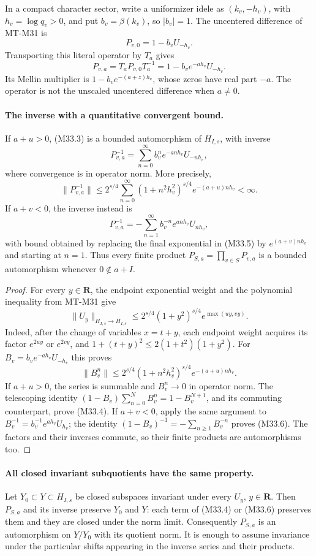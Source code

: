 In a compact character sector, write a uniformizer idele
as $(k_v,-h_v)$, with $h_v=\log q_v>0$, and put
$b_v=\beta(k_v)$, so $|b_v|=1$.
The uncentered difference of MT-M31 is
\[
 P_{v,0}=1-b_vU_{-h_v}.
\]
Transporting this literal operator by $T_a$ gives
\[
 P_{v,a}=T_aP_{v,0}T_a^{-1}
                 =1-b_ve^{-ah_v}U_{-h_v}.
 \tag{M33.3}
\]
Its Mellin multiplier is
$1-b_ve^{-(a+z)h_v}$, whose zeros have real part $-a$.
The operator is not the unscaled uncentered difference
when $a\ne0$.

\paragraph{The inverse with a quantitative convergent bound.}
If $a+u>0$, (M33.3) is a bounded automorphism of
$H_{I,s}$, with inverse
\[
 P_{v,a}^{-1}
       =\sum_{n=0}^{\infty}b_v^ne^{-anh_v}U_{-nh_v},
 \tag{M33.4}
\]
where convergence is in operator norm.  More precisely,
\[
 \|P_{v,a}^{-1}\|
 \leq 2^{s/4}\sum_{n=0}^{\infty}
       (1+n^2h_v^2)^{s/4}e^{-(a+u)nh_v}<\infty.
 \tag{M33.5}
\]
If $a+v<0$, the inverse instead is
\[
 P_{v,a}^{-1}
      =-\sum_{n=1}^{\infty}b_v^{-n}e^{anh_v}U_{nh_v},
 \tag{M33.6}
\]
with bound obtained by replacing the final exponential
in (M33.5) by $e^{(a+v)nh_v}$ and starting at $n=1$.
Thus every finite product
$P_{S,a}=\prod_{v\in S}P_{v,a}$ is a bounded
automorphism whenever $0\notin a+I$.

\begin{proof}
For every $y\in\mathbf R$, the endpoint exponential
weight and the polynomial inequality from MT-M31 give
\[
 \|U_y\|_{H_{I,s}\to H_{I,s}}
 \leq2^{s/4}(1+y^2)^{s/4}
                      e^{\max(uy,vy)}.
 \tag{M33.7}
\]
Indeed, after the change of variables $x=t+y$, each
endpoint weight acquires its factor $e^{2uy}$ or
$e^{2vy}$, and
$1+(t+y)^2\leq2(1+t^2)(1+y^2)$.
For $B_v=b_ve^{-ah_v}U_{-h_v}$ this proves
\[
 \|B_v^n\|\leq2^{s/4}(1+n^2h_v^2)^{s/4}
                                      e^{-(a+u)nh_v}.
\]
If $a+u>0$, the series is summable and $B_v^n\to0$
in operator norm.  The telescoping identity
$(1-B_v)\sum_{n=0}^{N}B_v^n=1-B_v^{N+1}$,
and its commuting counterpart, prove (M33.4).
If $a+v<0$, apply the same argument to
$B_v^{-1}=b_v^{-1}e^{ah_v}U_{h_v}$; the identity
$(1-B_v)^{-1}=-\sum_{n\geq1}B_v^{-n}$ proves
(M33.6).  The factors and their inverses commute,
so their finite products are automorphisms too.
\end{proof}

\paragraph{All closed invariant subquotients have the same property.}
Let $Y_0\subset Y\subset H_{I,s}$ be closed subspaces
invariant under every $U_y$, $y\in\mathbf R$.
Then $P_{S,a}$ and its inverse preserve $Y_0$ and $Y$:
each term of (M33.4) or (M33.6) preserves them and
they are closed under the norm limit.
Consequently $P_{S,a}$ is an automorphism on $Y/Y_0$
with its quotient norm.  It is enough to assume
invariance under the particular shifts appearing in
the inverse series and their products.

